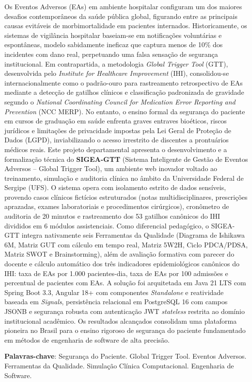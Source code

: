 \setlength{\absparsep}{18pt}
\begin{resumo}
Os Eventos Adversos (EAs) em ambiente hospitalar configuram um dos maiores desafios contemporâneos da saúde pública global, figurando entre as principais causas evitáveis de morbimortalidade em pacientes internados. Historicamente, os sistemas de vigilância hospitalar baseiam-se em notificações voluntárias e espontâneas, modelo sabidamente ineficaz que captura menos de 10\% dos incidentes com dano real, perpetuando uma falsa sensação de segurança institucional. Em contrapartida, a metodologia \textit{Global Trigger Tool} (GTT), desenvolvida pelo \textit{Institute for Healthcare Improvement} (IHI), consolidou-se internacionalmente como o padrão-ouro para rastreamento retrospectivo de EAs mediante a detecção de gatilhos clínicos e classificação padronizada de gravidade segundo o \textit{National Coordinating Council for Medication Error Reporting and Prevention} (NCC MERP). No entanto, o ensino formal da segurança do paciente em cursos de graduação em saúde enfrenta graves entraves bioéticos, riscos jurídicos e limitações de privacidade impostas pela Lei Geral de Proteção de Dados (LGPD), inviabilizando o acesso irrestrito de discentes a prontuários médicos reais. Este projeto departamental apresenta o desenvolvimento e a formalização técnica do \textbf{SIGEA-GTT} (Sistema Inteligente de Gestão de Eventos Adversos – Global Trigger Tool), um ambiente web inovador voltado ao treinamento, simulação e auditoria clínica no âmbito da Universidade Federal de Sergipe (UFS). O sistema opera com isolamento estrito de dados sensíveis, provendo casos clínicos fictícios estruturados (notas multidisciplinares, prescrições aprazadas, exames laboratoriais e procedimentos cirúrgicos), cronômetro de auditoria de 20 minutos e rastreamento dos 53 gatilhos canônicos do IHI divididos em 6 módulos assistenciais. Como diferencial pedagógico, o SIGEA-GTT integra nativamente seis Ferramentas da Qualidade (Diagrama de Ishikawa 6M, Matriz GUT com cálculo em tempo real, Matriz 5W2H, Ciclo PDCA/PDSA, Matriz SWOT e Brainstorming), além de avaliação formativa com parecer do docente e cálculo automático dos três indicadores epidemiológicos canônicos do IHI: taxa de EAs por 1.000 pacientes-dia, taxa de EAs por 100 admissões e percentual de pacientes com EAs. A solução foi arquitetada em Java 21 LTS com Spring Boot 3.3, Angular 18+ com componentes \textit{Standalone} e reatividade baseada em \textit{Signals}, persistência relacional em PostgreSQL 16 com campos JSONB e segurança robusta com autenticação JWT \textit{stateless} restrita ao domínio institucional acadêmico. Os resultados alcançados consolidam uma plataforma pioneira no Brasil para o ensino rigoroso de segurança do paciente fundamentado em métodos de engenharia de software de alta precisão.

\textbf{Palavras-chave}: Segurança do Paciente. Global Trigger Tool. Eventos Adversos. Ferramentas da Qualidade. Simulação Clínica Computacional. Engenharia de Software.
\end{resumo}